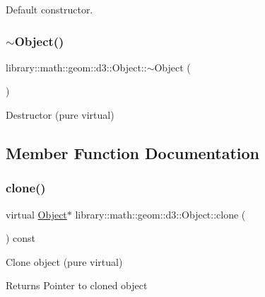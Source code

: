 Default constructor. 

\mbox{\label{classlibrary_1_1math_1_1geom_1_1d3_1_1_object_addfda217130395f6eeb080a2fe406876}} 
\subsubsection{\texorpdfstring{$\sim$\+Object()}{~Object()}}
{\footnotesize\ttfamily library\+::math\+::geom\+::d3\+::\+Object\+::$\sim$\+Object (\begin{DoxyParamCaption}{ }\end{DoxyParamCaption})\hspace{0.3cm}{\ttfamily [pure virtual]}}



Destructor (pure virtual) 



\subsection{Member Function Documentation}
\mbox{\label{classlibrary_1_1math_1_1geom_1_1d3_1_1_object_a1a784c6b359e0eb97cd34fabc42f2f3f}} 
\subsubsection{\texorpdfstring{clone()}{clone()}}
{\footnotesize\ttfamily virtual \hyperlink{classlibrary_1_1math_1_1geom_1_1d3_1_1_object}{Object}$\ast$ library\+::math\+::geom\+::d3\+::\+Object\+::clone (\begin{DoxyParamCaption}{ }\end{DoxyParamCaption}) const\hspace{0.3cm}{\ttfamily [pure virtual]}}



Clone object (pure virtual) 

\begin{DoxyReturn}{Returns}
Pointer to cloned object 
\end{DoxyReturn}


